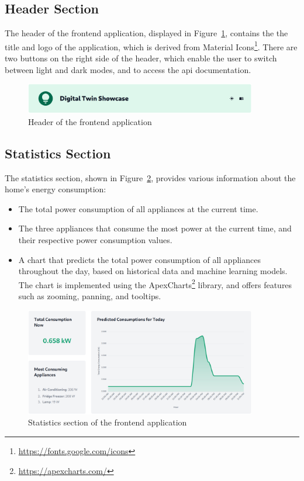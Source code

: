 \subsection{Header Section}

The header of the frontend application, displayed in Figure~\ref{fig:frontend_header}, contains the the title and logo of the application, which is derived from Material Icons\footnote{\url{https://fonts.google.com/icons}}. There are two buttons on the right side of the header, which enable the user to switch between light and dark modes, and to access the \acrshort{api} documentation.

\begin{figure}
    \centering
    \includegraphics[width=0.9\textwidth]{images/frontend/header.png}
    \caption{Header of the frontend application}
    \label{fig:frontend_header}
\end{figure}

\subsection{Statistics Section}

The statistics section, shown in Figure~\ref{fig:frontend_statistics}, provides various information about the home's energy consumption:
\begin{itemize}
    \item The total power consumption of all appliances at the current time.
    \item The three appliances that consume the most power at the current time, and their respective power consumption values.
    \item A chart that predicts the total power consumption of all appliances throughout the day, based on historical data and machine learning models. The chart is implemented using the ApexCharts\footnote{\url{https://apexcharts.com/}} library, and offers features such as zooming, panning, and tooltips.
\end{itemize}

\begin{figure}
    \centering
    \includegraphics[width=0.9\textwidth]{images/frontend/statistics.png}
    \caption{Statistics section of the frontend application}
    \label{fig:frontend_statistics}
\end{figure}

